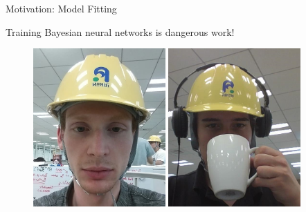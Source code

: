 \documentclass[mathserif,notheorems, hyperref={colorlinks, urlcolor=blue, linkcolor=blue}]{beamer}
\begin{document}
    \begin{frame}{Motivation: Model Fitting}
       \begin{center}
         Training Bayesian neural networks is dangerous work! 
       \end{center}
       
       \begin{figure}
            \centering
            \includegraphics[width=0.45\textwidth]{collaborators/helmet1} 
            \includegraphics[width=0.45\textwidth]{collaborators/helmet2} 
       \end{figure} 
    \end{frame}
\end{document}
